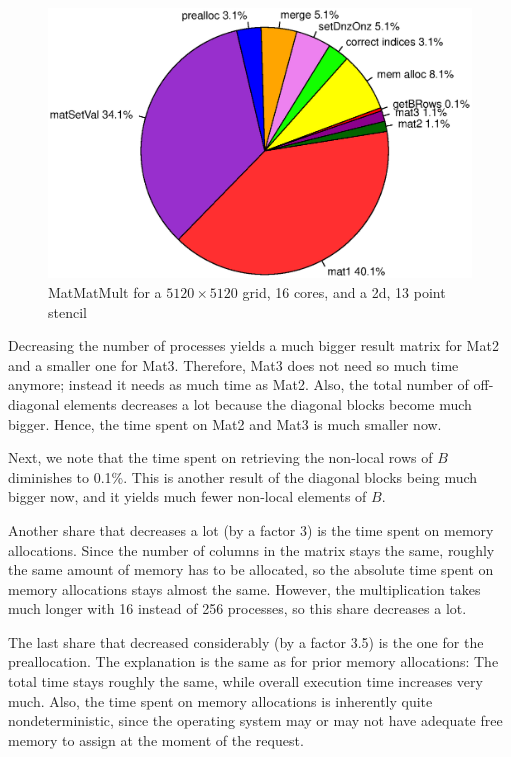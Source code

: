 \begin{figure}[tbp]
	\centering
	\includegraphics[width=1\textwidth, trim={0 3.5cm 0 3cm},clip]{16cores_5120}
	\caption{MatMatMult for a $5120 \times 5120$ grid, 16 cores, and a 2d, 13 point stencil} 
	\label{fig:pie_16_5120}
\end{figure}

Decreasing the number of processes yields a much bigger result matrix for Mat2 and a smaller one for Mat3. Therefore, Mat3 does not need so much time anymore; instead it needs as much time as Mat2. Also, the total number of off-diagonal elements decreases a lot because the diagonal blocks become much bigger. Hence, the time spent on Mat2 and Mat3 is much smaller now.

Next, we note that the time spent on retrieving the non-local rows of $B$ diminishes to 0.1\%. This is another result of the diagonal blocks being much bigger now, and it yields much fewer non-local elements of $B$.

Another share that decreases a lot (by a factor 3) is the time spent on memory allocations. Since the number of columns in the matrix stays the same, roughly the same amount of memory has to be allocated, so the absolute time spent on memory allocations stays almost the same. However, the multiplication takes much longer with 16 instead of 256 processes, so this share decreases a lot. 

The last share that decreased considerably (by a factor 3.5) is the one for the preallocation. The explanation is the same as for prior memory allocations: The total time stays roughly the same, while overall execution time increases very much. Also, the time spent on memory allocations is inherently quite nondeterministic, since the operating system may or may not have adequate free memory to assign at the moment of the request.

